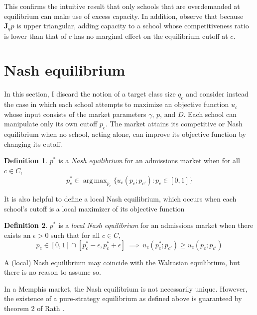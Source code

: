 \documentclass[12pt]{article}
\numberwithin{equation}{subsection}
\theoremstyle{definition}
\newtheorem{definition}{Definition}
\DeclareMathOperator*{\argmax}{arg\,max}
\begin{document}
This confirms the intuitive result that only schools that are overdemanded at equilibrium can make use of excess capacity. In addition, observe that because $\mathbf{J}_q \hat p$ is upper triangular, adding capacity to a school whose competitiveness ratio is lower than that of $c$ has no marginal effect on the equilibrium cutoff at $c$. 



\section{Nash equilibrium}
In this section, I discard the notion of a target class size $q_c$ and consider instead the case in which each school attempts to maximize an objective function $u_c$ whose input consists of the market parameters $\gamma$, $p$, and $D$. Each school can manipulate only its own cutoff $p_c$. The market attains its competitive or Nash equilibrium when no school, acting alone, can improve its objective function by changing its cutoff. 

\begin{definition} \label{nasheqconditions} $p^*$ is a \emph{Nash equilibrium} for an admissions market when for all $c \in C$,
\begin{equation} p_c^* \in \argmax_{p_c}\bigl\{ u_c(p_c; p_{c'}): p_c \in [0,1] \bigr\}\end{equation}
\end{definition}

It is also helpful to define a local Nash equilibrium, which occurs when each school's cutoff is a local maximizer of its objective function

\begin{definition} \label{localnasheqconditions} $p^*$ is a \emph{local Nash equilibrium} for an admissions market when there exists an $\epsilon > 0$ such that for all $c \in C$,
\begin{equation}p_c \in [0,1] \cap [p_c^* - \epsilon,  p_c^* + \epsilon] ~\implies~ u_c(p^*_c; p_{c'}) \geq u_c(p_c; p_{c'}) \end{equation}
\end{definition}
A (local) Nash equilibrium may coincide with the Walrasian equilibrium, but there is no reason to assume so. 

In a Memphis market, the Nash equilibrium is not necessarily unique. However, the existence of a pure-strategy equilibrium as defined above is guaranteed by theorem 2 of Rath \parencite*[][]{existenceofpurestrategyequilibria}. 
\end{document}

